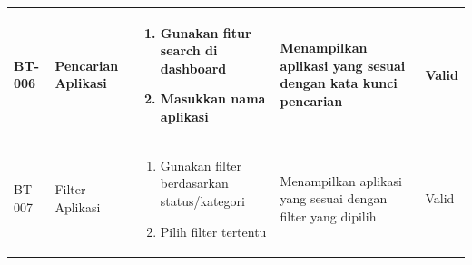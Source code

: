 \begin{table}[h]
\begin{adjustbox}{width=\textwidth}
\begin{tabular}{|p{0.8cm}|p{2.2cm}|p{4cm}|p{3.5cm}|p{1.2cm}|}
            BT-006            & Pencarian Aplikasi        & \begin{enumerate}[leftmargin=*,noitemsep,topsep=0pt,label=\arabic*.,widest=99]
                                                                \item Gunakan fitur search di dashboard
                                                                \item Masukkan nama aplikasi
                                                            \end{enumerate} & Menampilkan aplikasi yang sesuai dengan kata kunci pencarian       & Valid                                                                          \\ \hline
            BT-007            & Filter Aplikasi           & \begin{enumerate}[leftmargin=*,noitemsep,topsep=0pt,label=\arabic*.,widest=99]
                                                                \item Gunakan filter berdasarkan status/kategori
                                                                \item Pilih filter tertentu
                                                            \end{enumerate} & Menampilkan aplikasi yang sesuai dengan filter yang dipilih        & Valid                                                                          \\ \hline
        \end{tabular}
    \end{adjustbox}
\end{table}


